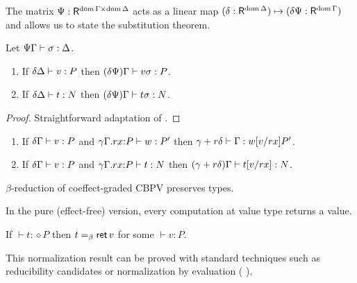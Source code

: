 \documentclass[acmsmall,review,anonymous]{acmart}\settopmatter{printfolios=true,printccs=false,printacmref=false}
\newtheorem{remark}{Remark}
\begin{document}
The matrix $\Psi : \R^{\dom \Gamma \times \dom \Delta}$ acts as a
linear map
$(\delta : \R^{\dom \Delta}) \mapsto (\delta\Psi : \R^{\dom \Gamma})$
and allows us to state the substitution theorem.
\begin{theorem}
  Let $\SubstTy \Psi \Gamma \sigma \Delta$.
  \begin{enumerate}
  \item If $\qValTy \delta \Delta v P$ then $\pValTy {\delta\Psi} \Gamma {v\sigma} P$.
  \item If $\qCompTy \delta \Delta t N$ then
    $\pCompTy {\delta\Psi} \Gamma {t\sigma} N$.
  \end{enumerate}
\end{theorem}
\begin{proof}
  Straightforward adaptation of \citet{atkeyWood:types19}.
\end{proof}
\begin{corollary}
  \label{cor:tysinglesub}
  \bla
  \begin{enumerate}
  \item If $\qValTy \delta \Gamma v P$ and
      $\ValTy {\qext \gamma \Gamma r x P} w {P'}$
      then $\ValTy {\gamma + r\delta} \Gamma {\qsubst v r x w} {P'}$.
  \item If $\qValTy \delta \Gamma v P$ and
      $\oCompTy {\qext \gamma \Gamma r x P} t {N}$
      then $\pCompTy {\gamma + r\delta} \Gamma {\qsubst v r x t} {N}$.
  \end{enumerate}
\end{corollary}
\begin{corollary}
  $\beta$-reduction of coeffect-graded CBPV preserves types.
\end{corollary}
In the pure (effect-free) version, every computation at value type
returns a value.
\begin{conjecture}
  If $\vdash t : \diamond P$ then $t =_{\beta} \ret v$ for some $\vdash v : P$.
\end{conjecture}
This normalization result can be proved with standard techniques such
as reducibility candidates or normalization by evaluation (\cf
\citet{abelSattler:ppdp19}).
\end{document}
